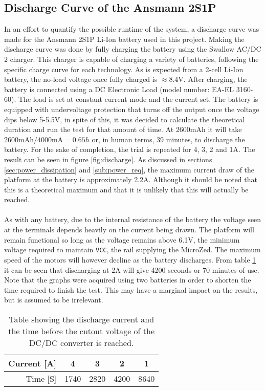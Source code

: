 \subsection{Discharge Curve of the Ansmann 2S1P} %
\label{sub:discharge_curve_of_the_ansmann_2s1p}
In an effort to quantify the possible runtime of the system, a discharge curve was made for the Ansmann 2S1P Li-Ion battery used in this project.
Making the discharge curve was done by fully charging the battery using the Swallow AC/DC 2 charger.
This charger is capable of charging a variety of batteries, following the specific charge curve for each technology.
As is expected from a 2-cell Li-Ion battery, the no-load voltage once fully charged is $\approx$8.4V.
After charging, the battery is connected using a DC Electronic Load (model number: EA-EL 3160-60).
The load is set at constant current mode and the current set.
The battery is equipped with undervoltage protection that turns off the output once the voltage dips below 5-5.5V, in spite of this, it was decided to calculate the theoretical duration and run the test for that amount of time.
At 2600mAh it will take $2600\text{mAh}/4000\text{mA}=0.65h$ or, in human terms, 39 minutes, to discharge the battery.
For the sake of completion, the trial is repeated for 4, 3, 2 and 1A.
The result can be seen in figure \ref{fig:discharge}.
As discussed in sections \ref{sec:power_dissipation} and \ref{sub:power_req}, the maximum current draw of the platform at the battery is approximately 2.2A.
Although it should be noted that this is a theoretical maximum and that it is unlikely that this will actually be reached.
\\~\\
As with any battery, due to the internal resistance of the battery the voltage seen at the terminals depends heavily on the current being drawn.
The platform will remain functional so long as the voltage remains above 6.1V, the minimum voltage required to maintain \texttt{VCC}, the rail supplying the MicroZed.
The maximum speed of the motors will however decline as the battery discharges.
From table \ref{tab:discharge} it can be seen that discharging at 2A will give 4200 seconds or 70 minutes of use.
Note that the graphs were acquired using two batteries in order to shorten the time required to finish the test.
This may have a marginal impact on the results, but is assumed to be irrelevant. 

\begin{table}[H]
  \centering
  \begin{tabular}{|r|c|c|c|c|}
    \hline
    Current [A] & 4 & 3 & 2 & 1 \\
    \hline
    Time [S] & 1740 & 2820 & 4200 &  8640\\
    \hline
  \end{tabular}
  \caption{Table showing the discharge current and the time before the cutout voltage of the DC/DC converter is reached.}
  \label{tab:discharge}
\end{table}

